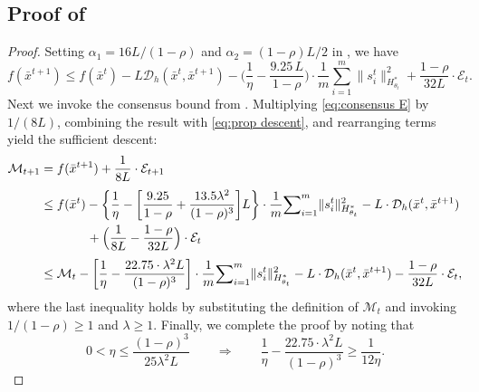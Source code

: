 \documentclass{article}
\theoremstyle{plain}
\theoremstyle{definition}
\theoremstyle{remark}
\newcommand{\sL}{L}
\newcommand{\cE}{\mathcal E}
\newcommand{\cD}{\mathcal{D}_{h}}
\newcommand{\cM}{\mathcal{M}}
\begin{document}
\subsection{Proof of \texorpdfstring{}{Lemma }}\label{appendix:proof of prop:descent}
\begin{proof}
    Setting $\alpha_1=16\sL/(1-\rho)$ and $\alpha_2=(1-\rho)\sL/2$ in , we have 
    \begin{equation}\label{eq:prop descent}
    f(\bar x^{t+1}) \leq  f(\bar x^t) - \sL \cD(\bar x^t,\bar x^{t+1}) -\bigg(\frac{1}{\eta}-\frac{9.25\,\sL}{1-\rho}\bigg)\cdot \frac{1}{m}{\sum}_{i=1}^m\|s^t_i\|_{H_{\theta_t}^*}^2 + \frac{1-\rho}{32\sL}\cdot \cE_t. 
    \end{equation}
    Next we invoke the consensus bound from . Multiplying \eqref{eq:consensus E} by $1/(8\sL)$, combining the result with \eqref{eq:prop descent}, and rearranging terms yield the sufficient descent:
     \begin{equation*} \begin{aligned}
       \cM_{t+1}&=f(\bar x^{t+1}) + \frac{1}{8\sL} \cdot \cE_{t+1}\\[1mm]
       &\leq 
       f(\bar x^t) - \bigg\{\frac{1}{\eta}-\bigg[\frac{9.25}{1-\rho} + \frac{13.5\lambda^2}{(1-\rho)^{3}}\bigg]\sL \bigg\}\cdot \frac{1}{m}{\sum}_{i=1}^m\|s^t_i\|_{H_{\theta_t}^*}^2 - \sL \cdot \cD(\bar x^t,\bar x^{t+1}) \\&\hspace{1.3cm}+ \Big(\frac{1}{8\sL} - \frac{1-\rho}{32 \sL} \Big) \cdot \cE_t\\[1mm]
       &\leq \cM_t - \bigg[\frac{1}{\eta} - \frac{22.75\cdot \lambda^2\sL}{(1-\rho)^{3}} \bigg]\cdot \frac{1}{m}{\sum}_{i=1}^m\|s^t_i\|_{H_{\theta_t}^*}^2 - \sL \cdot \cD(\bar x^t,\bar x^{t+1}) - \frac{1-\rho}{32\sL}\cdot \cE_t,
    \end{aligned} \end{equation*}
    where the last inequality holds by substituting the definition of $\cM_t$ and invoking $1/(1-\rho)\geq 1$ and $\lambda \geq 1$. Finally, we complete the proof by noting that 
    \begin{equation*}
        0<\eta \leq \frac{(1-\rho)^{3}}{25\lambda^2\sL} \qquad \Longrightarrow \qquad \frac1\eta - \frac{22.75\cdot \lambda^2\sL}{(1-\rho)^{3}} \geq \frac{1}{12\eta}. 
     \end{equation*}
\end{proof}
\end{document}
